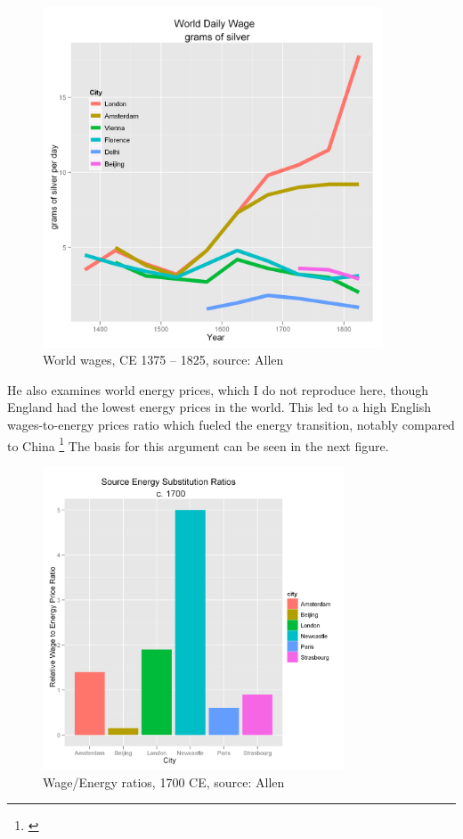 \documentclass[12pt]{article}
\numberwithin{equation}{section}
\begin{document}
		
		\begin{figure}[htb]
		\centering
		\includegraphics[width=0.9\textwidth]{gworldwages.png} 
		\caption{World wages, CE 1375 -- 1825, source: Allen \label{fig:allen_wages}}

		\end{figure}
		
		
		He also examines world energy prices, which I do not reproduce here, though England had the lowest energy prices in the world. This led to a high English wages-to-energy prices ratio which fueled the energy transition, notably compared to China \footnote{\citet[p.~140]{allen_british_2009}} The basis for this argument can be seen in the next figure. 
		
		
		\begin{figure}[htb]
		\centering
		\includegraphics[width=0.8\textwidth]{wage-energy.png}
		\caption{Wage/Energy ratios, 1700 CE, source: Allen}
		\label{fig:allen_ratios}
		\end{figure}
		
\end{document}
